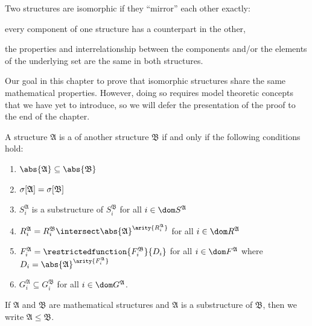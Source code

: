 \noindent
Two structures are isomorphic if they ``mirror'' each other exactly:
\begin{enumerate*}[label=(\roman*)]
    \item every component of one structure has a counterpart in the other,
    \item the properties and interrelationship between the components and/or the elements of the
          underlying set are the same in both structures.
\end{enumerate*}
Our goal in this chapter to prove that isomorphic structures share the same mathematical properties.
However, doing so requires model theoretic concepts that we have yet to introduce,
so we will defer the presentation of the proof to the end of the chapter.

\begin{dfn}[Substructure]
     \label{dfn:substructure}
    A structure \( \mathfrak{A} \) is a  of another structure \( \mathfrak{B} \) if and only if the following
    conditions hold:
    \begin{enumerate}[topsep=2pt,noitemsep,label=\textup{\texttt{(\alph*)}}]
        \item \( \abs{\mathfrak{A}} \subseteq \abs{\mathfrak{B}} \)
        \item \( \sigma \mleft[ \mathfrak{A} \mright] = \sigma \mleft[ \mathfrak{B} \mright] \)
        \item \( S^{\mathfrak{A}}_{i} \) is a substructure of \( S^{\mathfrak{B}}_{i} \) for all \( i \in \dom S^{\mathfrak{A}} \)
        \item \( R^{\mathfrak{A}}_{i} = R^{\mathfrak{B}}_{i} \intersect \abs{\mathfrak{A}}^{\arity{R^{\mathfrak{A}}_{i}}} \)
            for all \( i \in \dom R^{\mathfrak{A}} \)
        \item \( F^{\mathfrak{A}}_{i} = \restrictedfunction{F^{\mathfrak{B}}_{i}}{D_{i}} \)
            for all \( i \in \dom F^{\mathfrak{A}} \) where \( D_{i} = \abs{\mathfrak{A}}^{\arity{F^{\mathfrak{A}}_{i}}} \)
        \item \( G^{\mathfrak{A}}_{i} \subseteq G^{\mathfrak{B}}_{i} \) for all \( i \in \dom G^{\mathfrak{A}} \).
    \end{enumerate}
\end{dfn}

\begin{notation}
     \label{notation:substructure}
    If \( \mathfrak{A} \) and \( \mathfrak{B} \) are mathematical structures and \( \mathfrak{A} \) is a substructure
    of \( \mathfrak{B} \), then we write \( \mathfrak{A} \leq \mathfrak{B} \).
\end{notation}

